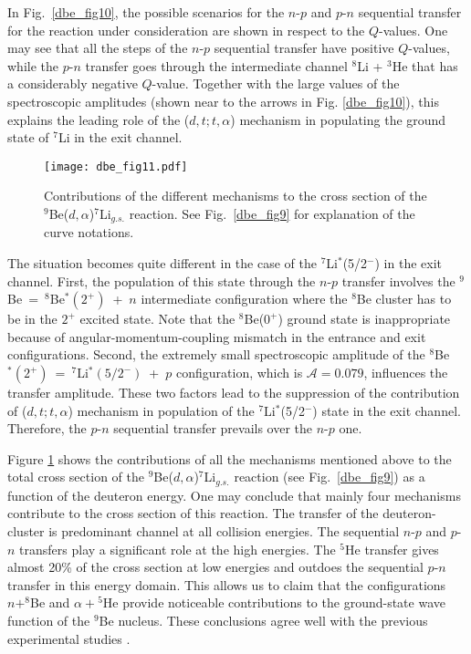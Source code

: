 \documentclass[
12pt, %
oneside, %
english, %
doublespacing, %
doublespacing, %
toctotoc, %
parskip, %
headsepline, %
]{MastersDoctoralThesis} %
\begin{document}
In Fig.~\ref{dbe_fig10}, the possible scenarios for the $n$-$p$ and $p$-$n$ sequential transfer for the reaction under consideration are shown in respect to the $Q$-values. One may see that all the steps of the $n$-$p$ sequential transfer have positive $Q$-values, while the $p$-$n$ transfer goes through the intermediate channel ${}^8$Li + ${}^3$He that has a considerably negative $Q$-value. Together with the large values of the spectroscopic amplitudes (shown near to the arrows in Fig. \ref{dbe_fig10}), this explains the leading role of the ($d,t;t,\alpha$) mechanism in populating the ground state of ${}^7$Li in the exit channel.

\begin{figure}[tp]
\centering
\texttt{[image: dbe\_fig11.pdf]}
\decoRule
\caption{\label{dbe_fig11}  Contributions of the different mechanisms to the cross section of the ${}^9$Be($d,\alpha$)${}^7$Li$_{g.s.}$ reaction. See Fig.~\ref{dbe_fig9} for explanation of the curve notations.}
\end{figure}	

The situation becomes quite different in the case of the ${}^7$Li$^*$(5/2$^-$) in the exit channel. First, the population of this state through the $n$-$p$ transfer involves the ${}^9$Be~=~${}^8$Be$^*(2^+)$~+~$n$ intermediate configuration where the ${}^8$Be cluster has to be in the $2^+$ excited state. Note that the ${}^8$Be($0^+$) ground state is inappropriate because of angular-momentum-coupling mismatch in the entrance and exit configurations. Second, the extremely small spectroscopic amplitude of the ${}^8$Be$^*(2^+)$~=~${}^7$Li$^*(5/2^-)$~+~$p$ configuration, which is $\mathcal{A} = 0.079$, influences the transfer amplitude. These two factors lead to the suppression of the contribution of ($d,t;t,\alpha$) mechanism in population of the ${}^7$Li$^*$(5/2$^-$) state in the exit channel. Therefore, the $p$-$n$ sequential transfer prevails over the $n$-$p$ one. 

Figure \ref{dbe_fig11} shows the contributions of all the mechanisms mentioned above to the total cross section of the ${}^9$Be($d,\alpha$)${}^7$Li$_{g.s.}$ reaction (see Fig.~\ref{dbe_fig9}) as a function of the deuteron energy. One may conclude that mainly four mechanisms contribute to the cross section of this reaction. The transfer of the deuteron-cluster is  predominant channel at all collision energies. The sequential $n$-$p$ and $p$-$n$ transfers play a significant role at the high energies. The ${}^5$He  transfer gives almost 20\% of the cross section at low energies and outdoes the sequential $p$-$n$ transfer in this energy domain. This allows us to claim that the configurations $n+^8$Be and $\alpha+{}^5$He provide noticeable contributions to the ground-state wave function of the ${}^9$Be nucleus. These conclusions agree well with the previous experimental studies \cite{brown2007, papka2007}.
\end{document}
